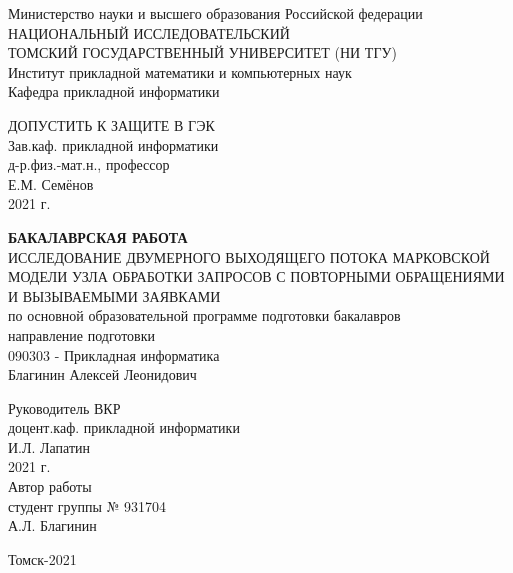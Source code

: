 	\begin{center}\linespread{1}
		\hfill \break
		\large{Министерство науки и высшего образования Российской федерации}\\
		\footnotesize{НАЦИОНАЛЬНЫЙ ИССЛЕДОВАТЕЛЬСКИЙ}\\ 
		\footnotesize{ТОМСКИЙ ГОСУДАРСТВЕННЫЙ УНИВЕРСИТЕТ (НИ ТГУ)}\\
		\footnotesize{Институт прикладной математики и компьютерных наук}\\
		\footnotesize{Кафедра прикладной информатики}\\
		\hfill\break
		\hfill \break
		\hfill \break
	\end{center}
\begin{flushright}\linespread{0.9}
	\normalsize{ДОПУСТИТЬ К ЗАЩИТЕ В ГЭК}\\ 
	\hfill \break
	\normalsize{ 
			Зав.каф. прикладной информатики\\  д-р.физ.-мат.н.,  профессор\\ \underline{\hspace{2cm}} Е.М. Семёнов\\
			\textquote{\underline{\hspace{0.7cm}}}\underline{\hspace{2cm}}2021 г.		
	}\\
\end{flushright}
\hfill \break
\hfill \break
\begin{center}\linespread{1}
		\large\textbf{ БАКАЛАВРСКАЯ РАБОТА}\\
		\hfill \break
		\large{ИССЛЕДОВАНИЕ ДВУМЕРНОГО ВЫХОДЯЩЕГО ПОТОКА МАРКОВСКОЙ МОДЕЛИ УЗЛА ОБРАБОТКИ ЗАПРОСОВ С ПОВТОРНЫМИ ОБРАЩЕНИЯМИ И ВЫЗЫВАЕМЫМИ ЗАЯВКАМИ}\\
		\hfill \break
		\hfill \break
		\normalsize{по основной образовательной программе подготовки бакалавров\\
			направление  подготовки\\
			090303 - Прикладная информатика\\
		\hfill \break
	Благинин Алексей Леонидович}\\
		\hfill \break
		\hfill \break
	\end{center}
\begin{flushright}\linespread{0.9}
	\normalsize{ 
		Руководитель ВКР\\
		 доцент.каф. прикладной информатики\\ \underline{\hspace{2cm}} И.Л. Лапатин\\
		 \textquote{\underline{\hspace{0.7cm}}}\underline{\hspace{2cm}}2021 г.\\
		 \hfill \break
		  Автор работы\\
		  студент группы № 931704\\ \underline{\hspace{2cm}} А.Л. Благинин	
	}\\
\end{flushright}
	\hfill \break
	\hfill \break
	\begin{center} Томск-2021 \end{center}
	\thispagestyle{empty} %
	\clearpage

